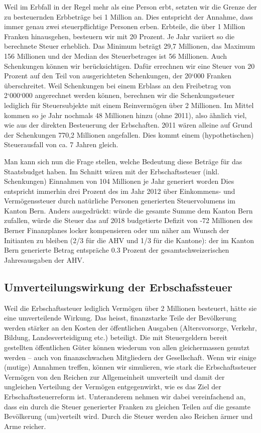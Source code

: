 \documentclass[a4paper, 12pt,liststotoc]{scrartcl}
\numberwithin{equation}{section}
\begin{document}
Weil im Erbfall in der Regel mehr als eine Person erbt, setzten wir die
Grenze der zu besteuernden Erbbeträge bei 1 Million an. Dies entspricht
der Annahme, dass immer genau zwei steuerpflichtige Personen erben.
Erbteile, die über 1 Million Franken hinausgehen, besteuern wir mit 20
Prozent. Je Jahr variiert so die berechnete Steuer erheblich. Das
Minimum beträgt 29,7 Millionen, das Maximum 156 Millionen und der Median
des Steuerbetrages ist 56 Millionen. Auch Schenkungen können wir
berücksichtigen. Dafür errechnen wir eine Steuer von 20 Prozent auf den
Teil von ausgerichteten Schenkungen, der 20`000 Franken überschreitet.
Weil Schenkungen bei einem Erblass an den Freibetrag von 2`000`000
angerechnet werden können, berechnen wir die Schenkungssteuer lediglich
für Steuersubjekte mit einem Reinvermögen über 2 Millionen. Im Mittel
kommen so je Jahr nochmals 48 Millionen hinzu (ohne 2011), also ähnlich
viel, wie aus der direkten Besteuerung der Erbschaften. 2011 wären
alleine auf Grund der Schenkungen 770,2 Millionen angefallen. Dies kommt
einem (hypothetischen) Steuerausfall von ca. 7 Jahren gleich.

Man kann sich nun die Frage stellen, welche Bedeutung diese Beträge für
das Staatsbudget haben. Im Schnitt wären mit der Erbschaftssteuer (inkl.
Schenkungen) Einnahmen von 104 Millionen je Jahr generiert worden Dies
entspricht immerhin drei Prozent des im Jahr 2012 über Einkommens- und
Vermögenssteuer durch natürliche Personen generierten Steuervolumens im
Kanton Bern. Anders ausgedrückt: würde die gesamte Summe dem Kanton Bern
zufallen, würde die Steuer das auf 2018 budgetierte Defizit von -72
Millionen des Berner Finanzplanes locker kompensieren oder um näher am
Wunsch der Initianten zu bleiben (2/3 für die AHV und 1/3 für die
Kantone): der im Kanton Bern generierte Betrag entspräche 0.3 Prozent
der gesamtschweizerischen Jahresausgaben der AHV.

\subsection{Umverteilungswirkung der
Erbschafssteuer}\label{umverteilungswirkung-der-erbschafssteuer}

Weil die Erbschaftssteuer lediglich Vermögen über 2 Millionen besteuert,
hätte sie eine umverteilende Wirkung. Das heisst, finanzstarke Teile der
Bevölkerung werden stärker an den Kosten der öffentlichen Ausgaben
(Altersvorsorge, Verkehr, Bildung, Landesverteidigung etc.) beteiligt.
Die mit Steuergeldern bereit gestellten öffentlichen Güter können
wiederum von allen gleichermassen genutzt werden -- auch von
finanzschwachen Mitgliedern der Gesellschaft. Wenn wir einige (mutige)
Annahmen treffen, können wir simulieren, wie stark die Erbschaftssteuer
Vermögen von den Reichen zur Allgemeinheit umverteilt und damit der
ungleichen Verteilung der Vermögen entgegenwirkt, wie es das Ziel der
Erbschaftssteuerreform ist. Unteranderem nehmen wir dabei vereinfachend
an, dass ein durch die Steuer generierter Franken zu gleichen Teilen auf
die gesamte Bevölkerung (um)verteilt wird. Durch die Steuer werden also
Reichen ärmer und Arme reicher.
\end{document}

